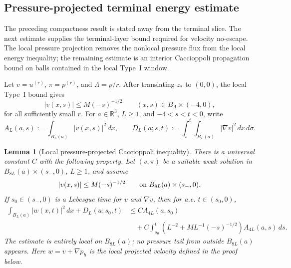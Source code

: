 \documentclass[11pt]{amsart}
\numberwithin{equation}{section}
\theoremstyle{plain}
\newtheorem{lemma}[lemma]{Lemma}
\theoremstyle{definition}
\theoremstyle{remark}
\begin{document}
\subsection{Pressure-projected terminal energy estimate}
\label{subsec:pressure-projected-terminal-estimate}

The preceding compactness result is stated away from the terminal
slice.  The next estimate supplies the terminal-layer bound required for
velocity no-escape.  The local pressure projection removes the nonlocal pressure
flux from the local energy inequality; the remaining estimate is an interior
Caccioppoli propagation bound on balls contained in the local Type~I window.

Let \(v=u^{(r)}\), \(\pi=p^{(r)}\), and
\(\Lambda=\rho/r\).  After translating \(z_*\) to \((0,0)\), the local Type~I
bound gives
\[
   |v(x,s)|\le M(-s)^{-1/2}
   \qquad (x,s)\in B_\Lambda\times(-4,0),
\]
for all sufficiently small \(r\).  For \(a\in\mathbb R^3\), \(L\ge1\), and
\(-4<s<t<0\), write
\[
   A_L(a,s):=\int_{B_L(a)}|v(x,s)|^2\,dx,\qquad
   D_L(a;s,t):=\int_s^t\int_{B_L(a)}|\nabla v|^2\,dx\,d\sigma .
\]

\begin{lemma}[Local pressure-projected Caccioppoli inequality]
\label{lem:local-pressure-projected-caccioppoli}
There is a universal constant \(C\) with the following property.  Let
\((v,\pi)\) be a suitable weak solution in
\(B_{8L}(a)\times(s_-,0)\), \(L\ge1\), and assume
\[
   |v(x,s)|\le M(-s)^{-1/2}
   \qquad\hbox{on }B_{8L}(a)\times(s_-,0).
\]
If \(s_0\in(s_-,0)\) is a Lebesgue time for \(v\) and \(\nabla v\), then for
a.e. \(t\in(s_0,0)\),
\begin{equation}\label{eq:pressure-projected-caccioppoli}
\begin{aligned}
   \int_{B_L(a)}|w(x,t)|^2\,dx+D_L(a;s_0,t)
   &\le
   C A_{4L}(a,s_0)                                      \\
   &\quad
   +C\int_{s_0}^{t}
      \left(L^{-2}+ML^{-1}(-s)^{-1/2}\right)
      A_{4L}(a,s)\,ds .
\end{aligned}
\end{equation}
The estimate is entirely local on \(B_{8L}(a)\); no pressure tail from outside
\(B_{8L}(a)\) appears.  Here \(w=v+\nabla p_h\) is the local projected velocity
defined in the proof below.
\end{lemma}
\end{document}
